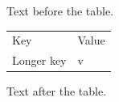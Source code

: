 \documentclass[12pt]{article}
\begin{document}
Text before the table.

\begin{tabular}{@{}ll@{}}Key & Value\\Longer key & v\end{tabular}

Text after the table.
\end{document}
